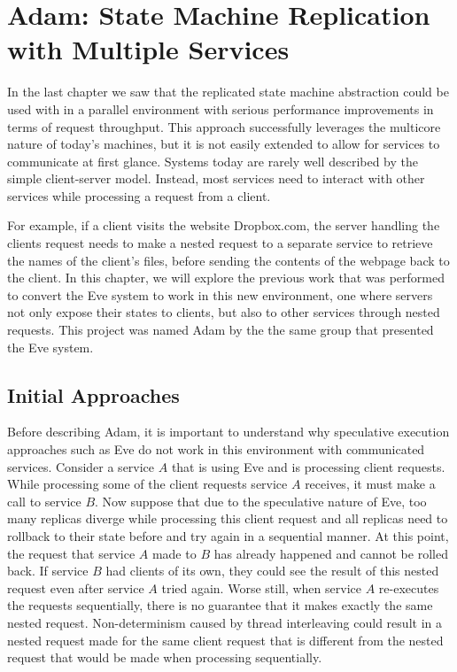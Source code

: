 \documentclass[11pt, oneside]{report}
\begin{document}
\chapter{Adam: State Machine Replication with Multiple Services}\label{Adam}

In the last chapter we saw that the replicated state machine abstraction could be used with in a parallel environment with serious performance improvements in terms of request throughput. This approach successfully leverages the multicore nature of today's machines, but it is not easily extended to allow for services to communicate at first glance. Systems today are rarely well described by the simple client-server model. Instead, most services need to interact with other services while processing a request from a client. 

For example, if a client visits the website Dropbox.com, the server handling the clients request needs to make a nested request to a separate service to retrieve the names of the client's files, before sending the contents of the webpage back to the client. In this chapter, we will explore the previous work that was performed to convert the Eve system to work in this new environment, one where servers not only expose their states to clients, but also to other services through nested requests. This project was named Adam by the the same group that presented the Eve system.

\section{Initial Approaches}

Before describing Adam, it is important to understand why speculative execution approaches such as Eve do not work in this environment with communicated services. Consider a service $A$ that is using Eve and is processing client requests. While processing some of the client requests service $A$ receives, it must make a call to service $B$. Now suppose that due to the speculative nature of Eve, too many replicas diverge while processing this client request and all replicas need to rollback to their state before and try again in a sequential manner. At this point, the request that service $A$ made to $B$ has already happened and cannot be rolled back. If service $B$ had clients of its own, they could see the result of this nested request even after service $A$ tried again. Worse still, when service $A$ re-executes the requests sequentially, there is no guarantee that it makes exactly the same nested request. Non-determinism caused by thread interleaving could result in a nested request made for the same client request that is different from the nested request that would be made when processing sequentially.
\end{document}
